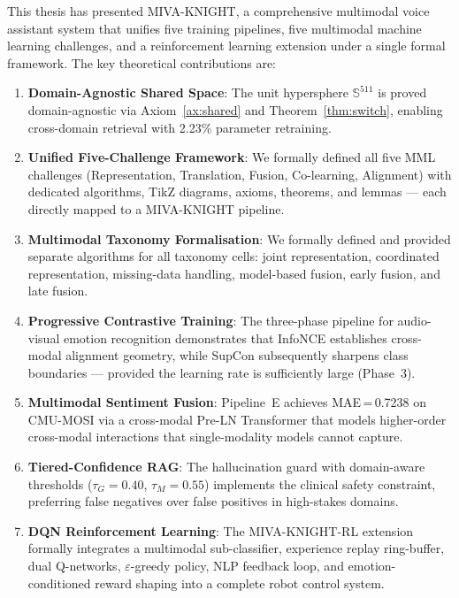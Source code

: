 \documentclass[12pt,a4paper]{article}
\theoremstyle{definition}
\theoremstyle{plain}
\theoremstyle{remark}
\newcommand{\Sph}{\mathbb{S}}
\begin{document}
This thesis has presented MIVA-KNIGHT, a comprehensive multimodal voice assistant system that unifies five training pipelines, five multimodal machine learning challenges, and a reinforcement learning extension under a single formal framework. The key theoretical contributions are:

\begin{enumerate}
  \item \textbf{Domain-Agnostic Shared Space}: The unit hypersphere $\Sph^{511}$ is proved domain-agnostic via Axiom~\ref{ax:shared} and Theorem~\ref{thm:switch}, enabling cross-domain retrieval with 2.23\% parameter retraining.

  \item \textbf{Unified Five-Challenge Framework}: We formally defined all five MML challenges (Representation, Translation, Fusion, Co-learning, Alignment) with dedicated algorithms, TikZ diagrams, axioms, theorems, and lemmas --- each directly mapped to a MIVA-KNIGHT pipeline.

  \item \textbf{Multimodal Taxonomy Formalisation}: We formally defined and provided separate algorithms for all taxonomy cells: joint representation, coordinated representation, missing-data handling, model-based fusion, early fusion, and late fusion.

  \item \textbf{Progressive Contrastive Training}: The three-phase pipeline for audio-visual emotion recognition demonstrates that InfoNCE establishes cross-modal alignment geometry, while SupCon subsequently sharpens class boundaries --- provided the learning rate is sufficiently large (Phase~3).

  \item \textbf{Multimodal Sentiment Fusion}: Pipeline~E achieves MAE\,=\,0.7238 on CMU-MOSI via a cross-modal Pre-LN Transformer that models higher-order cross-modal interactions that single-modality models cannot capture.

  \item \textbf{Tiered-Confidence RAG}: The hallucination guard with domain-aware thresholds ($\tau_G = 0.40$, $\tau_M = 0.55$) implements the clinical safety constraint, preferring false negatives over false positives in high-stakes domains.

  \item \textbf{DQN Reinforcement Learning}: The MIVA-KNIGHT-RL extension formally integrates a multimodal sub-classifier, experience replay ring-buffer, dual Q-networks, $\varepsilon$-greedy policy, NLP feedback loop, and emotion-conditioned reward shaping into a complete robot control system.


\end{enumerate}
\end{document}
